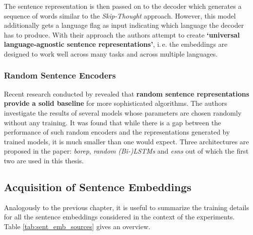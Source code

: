 The sentence representation is then passed on to the decoder which generates a sequence of words similar to the \textit{Skip-Thought} approach. However, this model additionally gets a language flag as input indicating which language the decoder has to produce. With their approach the authors attempt to create \textbf{`universal language-agnostic sentence representations'}, i.\,e. the embeddings are designed to work well across many tasks and across multiple languages.

\subsubsection{Random Sentence Encoders}
\label{sec:rand_sent}

Recent research conducted by \citep{Wieting.2019} revealed that \textbf{random sentence representations provide a solid baseline} for more sophisticated algorithms. The authors investigate the results of several models whose parameters are chosen randomly without any training. It was found that while there is a gap between the performance of such random encoders and the representations generated by trained models, it is much smaller than one would expect. Three architectures are proposed in the paper:  \textit{\gls{borep}},  \textit{random (Bi-)LSTMs} and  \textit{\glspl{esn}} \citep{Jaeger.2001} out of which the first two are used in this thesis.

\subsection{Acquisition of Sentence Embeddings}
\label{sec:sent_embs_acquisition}

Analogously to the previous chapter, it is useful to summarize the training details for all the sentence embeddings considered in the context of the experiments. Table \vref{tab:sent_emb_sources} gives an overview.


